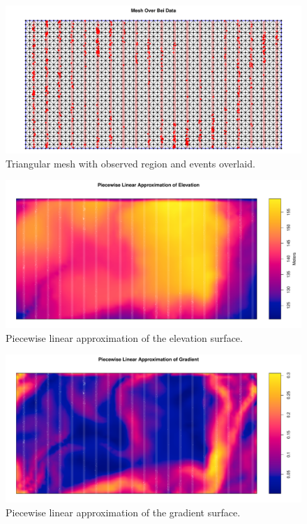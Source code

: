 \documentclass[]{interact}
\begin{document}
\begin{figure}[h]
\includegraphics[width=\textwidth]{figures/bei-effort_mesh.pdf}
\caption{Triangular mesh with observed region and events overlaid.}
\label{effortmesh}
\end{figure}

\begin{figure}[h]
\includegraphics[width=\textwidth]{figures/bei-effort_elev_mesh.pdf}
\caption{Piecewise linear approximation of the elevation surface.}
\label{effortelevmesh}
\end{figure}

\begin{figure}[h]
\includegraphics[width=\textwidth]{figures/bei-effort_grad_mesh.pdf}
\caption{Piecewise linear approximation of the gradient surface.}
\label{effortgradmesh}
\end{figure}
\end{document}
